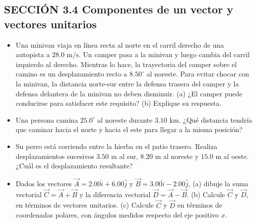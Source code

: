 \documentclass[11pt,a4paper]{article}
\begin{document}
\newpage

\subsection*{SECCIÓN 3.4 Componentes de un vector y vectores unitarios}

\begin{itemize}
    \item[\textbf{11.}] Una minivan viaja en línea recta al norte en el carril derecho de una autopista a $28.0 \text{ m/s}$. Un camper pasa a la minivan y luego cambia del carril izquierdo al derecho. Mientras lo hace, la trayectoria del camper sobre el camino es un desplazamiento recto a $8.50^\circ$ al noreste. Para evitar chocar con la minivan, la distancia norte-sur entre la defensa trasera del camper y la defensa delantera de la minivan no deben disminuir. (a) ¿El camper puede conducirse para satisfacer este requisito? (b) Explique su respuesta.
    \vspace*{6cm}

    \item[\textbf{12.}] Una persona camina $25.0^\circ$ al noreste durante $3.10 \text{ km}$. ¿Qué distancia tendría que caminar hacia el norte y hacia el este para llegar a la misma posición?
    \vspace*{6cm}

    \item[\textbf{13.}] Su perro está corriendo entre la hierba en el patio trasero. Realiza desplazamientos sucesivos $3.50 \text{ m}$ al sur, $8.20 \text{ m}$ al noreste y $15.0 \text{ m}$ al oeste. ¿Cuál es el desplazamiento resultante?
    \vspace*{6cm}

    \item[\textbf{14.}] Dados los vectores $\vec{A} = 2.00\hat{i} + 6.00\hat{j}$ y $\vec{B} = 3.00\hat{i} - 2.00\hat{j}$, (a) dibuje la suma vectorial $\vec{C} = \vec{A} + \vec{B}$ y la diferencia vectorial $\vec{D} = \vec{A} - \vec{B}$. (b) Calcule $\vec{C}$ y $\vec{D}$, en términos de vectores unitarios. (c) Calcule $\vec{C}$ y $\vec{D}$ en términos de coordenadas polares, con ángulos medidos respecto del eje positivo $x$.
    \vspace*{7cm}
\end{itemize}

\newpage
\end{document}
